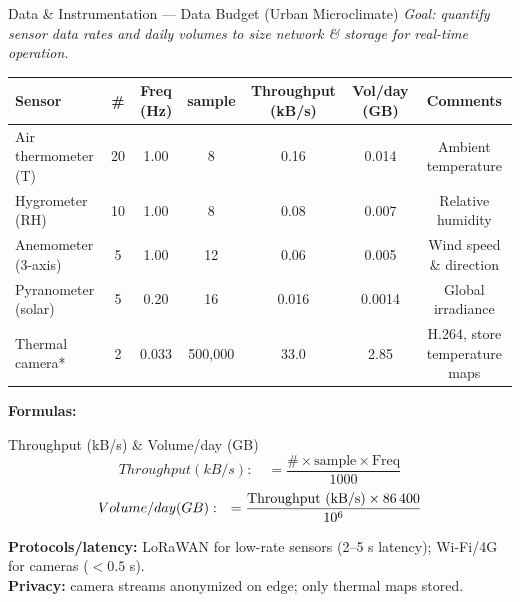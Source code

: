 \documentclass{beamer}
\begin{document}
\begin{frame}{Data \& Instrumentation — Data Budget (Urban Microclimate)}
\tiny
\setlength{\tabcolsep}{3pt}  
\textit{Goal: quantify sensor data rates and daily volumes to size network \& storage for real-time operation.}

\vspace{2mm}
\begin{tabular}{lcccccc}
\textbf{Sensor} & \textbf{\#} & \textbf{Freq (Hz)} & \textbf{sample} & \textbf{Throughput (kB/s)} & \textbf{Vol/day (GB)} & \textbf{Comments} \\
\hline
Air thermometer (T)   & 20 & 1.00  & 8        & 0.16  & 0.014 & Ambient temperature \\
Hygrometer (RH)       & 10 & 1.00  & 8        & 0.08  & 0.007 & Relative humidity \\
Anemometer (3-axis)   & 5  & 1.00  & 12       & 0.06  & 0.005 & Wind speed \& direction \\
Pyranometer (solar)   & 5  & 0.20  & 16       & 0.016 & 0.0014& Global irradiance \\
Thermal camera*       & 2  & 0.033 & 500{,}000& 33.0  & 2.85  & H.264, store temperature maps \\
\hline
\end{tabular}

\vspace{1mm}
\footnotesize
\textbf{Formulas:}
\begin{block}{Throughput (kB/s) \& Volume/day (GB)}
    $$Throughput (kB/s): \quad = \dfrac{\# \times \text{sample} \times \text{Freq}}{1000}$$
    $$ \noindent Volume/day (GB): \quad = \dfrac{\text{Throughput (kB/s)} \times 86\,400}{10^{6}}$$
\end{block}
\vspace{0.5mm}
\scriptsize
\textbf{Protocols/latency:} LoRaWAN for low-rate sensors (2–5 s latency); Wi-Fi/4G for cameras ($<0.5$ s).  \\
\textbf{Privacy:} camera streams anonymized on edge; only thermal maps stored.
\end{frame}
\end{document}

